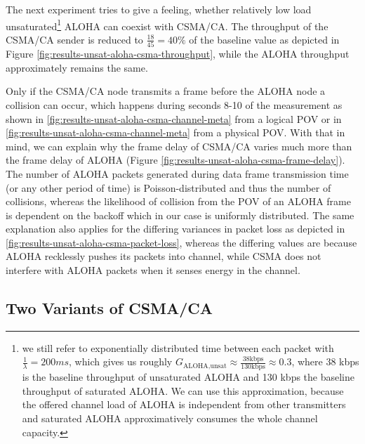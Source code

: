The next experiment tries to give a feeling, whether relatively low load unsaturated\footnote{we still refer to exponentially distributed time between each packet with $\frac{1}{\lambda}=200ms$, which gives us roughly $G_\text{ALOHA,unsat} \approx \frac{38 \text{kbps}}{130 \text{kbps}}\approx 0.3$, where 38 kbps is the baseline throughput of unsaturated ALOHA and 130 kbps the baseline throughput of saturated ALOHA. We can use this approximation, because the offered channel load of ALOHA is independent from other transmitters and saturated ALOHA approximatively consumes the whole channel capacity.} ALOHA can coexist with CSMA/CA. The throughput of the CSMA/CA sender is reduced to $\frac{18}{45}=40\%$ of the baseline value as depicted in Figure \ref{fig:results-unsat-aloha-csma-throughput}, while the ALOHA throughput approximately remains the same.

Only if the CSMA/CA node transmits a frame before the ALOHA node a collision can occur, which happens during seconds 8-10 of the measurement as shown in \ref{fig:results-unsat-aloha-csma-channel-meta} from a logical POV or in  \ref{fig:results-unsat-aloha-csma-channel-meta} from a physical POV. With that in mind, we can explain why the frame delay of CSMA/CA varies much more than the frame delay of ALOHA (Figure  \ref{fig:results-unsat-aloha-csma-frame-delay}). The number of ALOHA packets generated during data frame transmission time (or any other period of time) is Poisson-distributed and thus the number of collisions, whereas the likelihood of collision from the POV of an ALOHA frame is dependent on the backoff which in our case is uniformly distributed. The same explanation also applies for the differing variances in packet loss as depicted in \ref{fig:results-unsat-aloha-csma-packet-loss}, whereas the differing values are because ALOHA recklessly pushes its packets into channel, while CSMA does not interfere with ALOHA packets when it senses energy in the channel.

\clearpage

\subsection{Two Variants of CSMA/CA}

